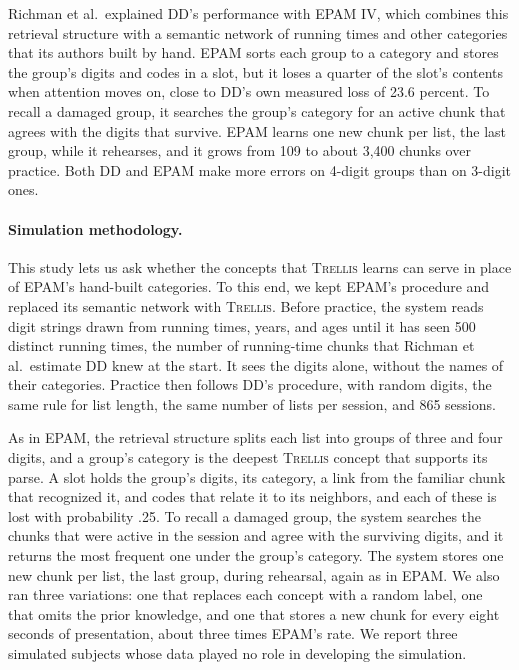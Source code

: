 \documentclass[11pt,letterpaper]{article}
\newcommand{\trellis}{\textsc{Trellis}}
\begin{document}
Richman et al.\ explained DD's performance with EPAM IV, which combines this retrieval
structure with a semantic network of running times and other categories that its authors
built by hand. EPAM sorts each group to a category and stores the group's digits and
codes in a slot, but it loses a quarter of the slot's contents when attention moves on,
close to DD's own measured loss of 23.6 percent. To recall a damaged group, it searches
the group's category for an active chunk that agrees with the digits that survive. EPAM
learns one new chunk per list, the last group, while it rehearses, and it grows from 109
to about 3,400 chunks over practice. Both DD and EPAM make more errors on 4-digit groups
than on 3-digit ones.

\paragraph{Simulation methodology.} This study lets us ask whether the concepts that
\trellis{} learns can serve in place of EPAM's hand-built categories. To this end, we
kept EPAM's procedure and replaced its semantic network with \trellis{}. Before practice,
the system reads digit strings drawn from running times, years, and ages until it has
seen 500 distinct running times, the number of running-time chunks that Richman et al.\
estimate DD knew at the start. It sees the digits alone, without the names of their
categories. Practice then follows DD's procedure, with random digits, the same rule for
list length, the same number of lists per session, and 865 sessions.

As in EPAM, the retrieval structure splits each list into groups of three and four
digits, and a group's category is the deepest \trellis{} concept that supports its parse.
A slot holds the group's digits, its category, a link from the familiar chunk that
recognized it, and codes that relate it to its neighbors, and each of these is lost with
probability .25. To recall a damaged group, the system searches the chunks that were
active in the session and agree with the surviving digits, and it returns the most
frequent one under the group's category. The system stores one new chunk per list, the
last group, during rehearsal, again as in EPAM. We also ran three variations: one that
replaces each concept with a random label, one that omits the prior knowledge, and one
that stores a new chunk for every eight seconds of presentation, about three times
EPAM's rate. We report three simulated subjects whose data played no role in developing
the simulation.
\end{document}
